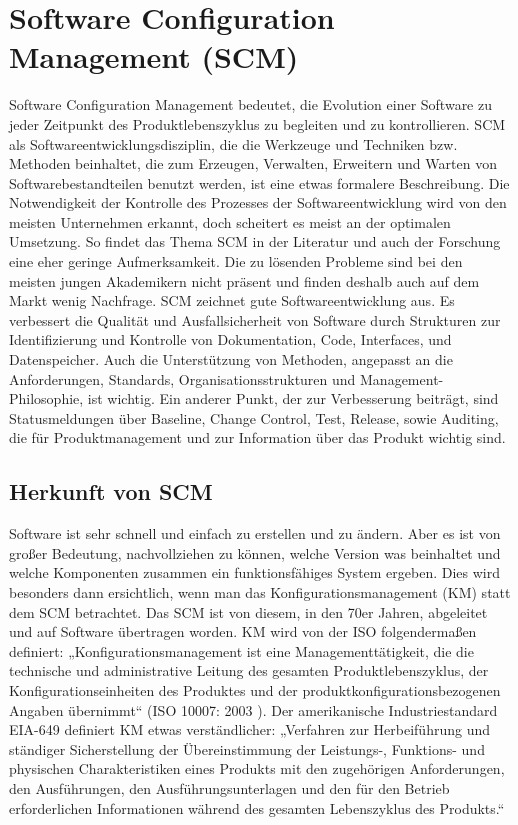 \chapter{Software Configuration Management (\acs{SCM})}
Software Configuration Management bedeutet, die Evolution einer Software zu jeder Zeitpunkt des Produktlebenszyklus zu begleiten und zu kontrollieren. \acs{SCM} als Softwareentwicklungsdisziplin, die die Werkzeuge und Techniken bzw. Methoden beinhaltet, die zum Erzeugen, Verwalten, Erweitern und Warten von Softwarebestandteilen benutzt werden, ist eine etwas formalere Beschreibung. Die Notwendigkeit der Kontrolle des Prozesses der Softwareentwicklung wird von den meisten Unternehmen erkannt, doch scheitert es meist an der optimalen Umsetzung. So findet das Thema SCM in der Literatur und auch der Forschung eine eher geringe Aufmerksamkeit. Die zu lösenden Probleme sind bei den meisten jungen Akademikern nicht präsent und finden deshalb auch auf dem Markt wenig Nachfrage. SCM zeichnet gute Softwareentwicklung aus. Es verbessert die Qualität und Ausfallsicherheit von Software durch Strukturen zur Identifizierung und Kontrolle von Dokumentation, Code, Interfaces, und Datenspeicher. Auch die Unterstützung von Methoden, angepasst an die Anforderungen, Standards, Organisationsstrukturen und Management-Philosophie, ist wichtig. Ein anderer Punkt, der zur Verbesserung beiträgt, sind Statusmeldungen über Baseline, Change Control, Test, Release, sowie Auditing, die für Produktmanagement und zur Information über das Produkt wichtig sind. 

\section{Herkunft von SCM}
Software ist sehr schnell und einfach zu erstellen und zu ändern. Aber es ist von großer Bedeutung, nachvollziehen zu können, welche Version was beinhaltet und welche Komponenten zusammen ein funktionsfähiges System ergeben. Dies wird besonders dann ersichtlich, wenn man das Konfigurationsmanagement (KM) statt dem SCM betrachtet. Das SCM ist von diesem, in den 70er Jahren, abgeleitet und auf Software übertragen worden. KM wird von der ISO folgendermaßen definiert: „Konfigurationsmanagement ist eine Managementtätigkeit, die die technische und administrative Leitung des gesamten Produktlebenszyklus, der Konfigurationseinheiten des Produktes und der produktkonfigurationsbezogenen Angaben übernimmt“ (\acs{ISO} 10007: 2003 \cite{km-hamburg}). Der amerikanische Industriestandard EIA-649 definiert KM etwas verständlicher: „Verfahren zur Herbeiführung und ständiger Sicherstellung der Übereinstimmung der Leistungs-, Funktions- und physischen Charakteristiken eines Produkts mit den zugehörigen Anforderungen, den Ausführungen, den Ausführungsunterlagen und den für den Betrieb erforderlichen Informationen während des gesamten Lebenszyklus des Produkts.“ \cite{gbt-km}

